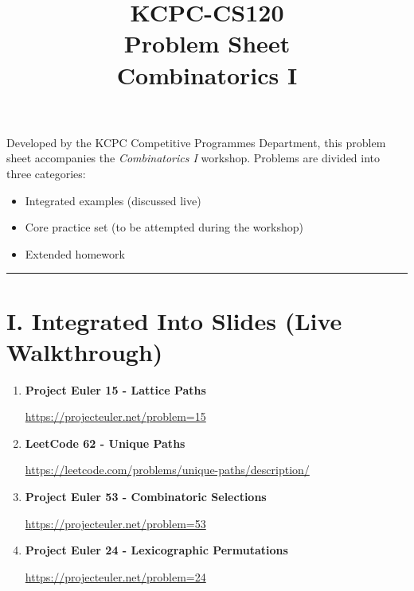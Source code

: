 \documentclass[11pt]{article}
\title{KCPC-CS120 \\ Problem Sheet \\ Combinatorics I}
\author{}
\date{}
\begin{document}
\maketitle

\noindent
Developed by the KCPC Competitive Programmes Department, this problem sheet accompanies the \textit{Combinatorics I} workshop.  
Problems are divided into three categories:
\begin{itemize}
    \item Integrated examples (discussed live)
    \item Core practice set (to be attempted during the workshop)
    \item Extended homework
\end{itemize}

\hrule
\vspace{1em}

\section*{I. Integrated Into Slides (Live Walkthrough)}

\begin{enumerate}
    \item \textbf{Project Euler 15 - Lattice Paths}  

    \vspace{0.3em}
    {\url{https://projecteuler.net/problem=15}}
                \vspace{0.8em}

    \item \textbf{LeetCode 62 - Unique Paths}  


    \vspace{0.3em}
    {\url{https://leetcode.com/problems/unique-paths/description/}}

              \vspace{0.8em}

    \item \textbf{Project Euler 53 - Combinatoric Selections}  
    
    \vspace{0.3em}
    {\url{https://projecteuler.net/problem=53}}
    
            \vspace{0.8em}

    \item \textbf{Project Euler 24 - Lexicographic Permutations}  
    
    \vspace{0.3em}
    {\url{https://projecteuler.net/problem=24}}

\end{enumerate}
\end{document}
